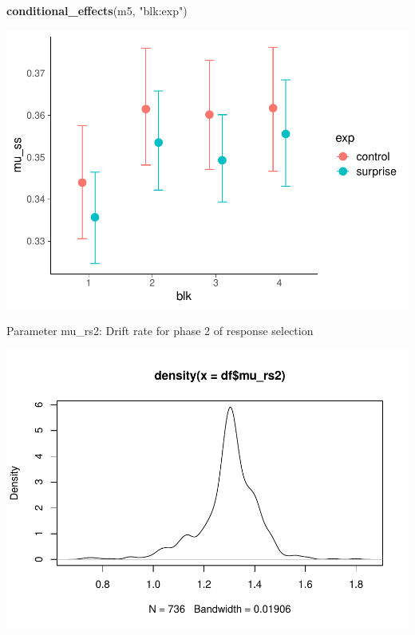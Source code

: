 \documentclass[
]{article}
\newenvironment{Shaded}{\begin{snugshade}}{\end{snugshade}}
\newcommand{\FunctionTok}[1]{\textcolor[rgb]{0.13,0.29,0.53}{\textbf{#1}}}
\newcommand{\NormalTok}[1]{#1}
\newcommand{\SpecialCharTok}[1]{\textcolor[rgb]{0.81,0.36,0.00}{\textbf{#1}}}
\newcommand{\StringTok}[1]{\textcolor[rgb]{0.31,0.60,0.02}{#1}}
\begin{document}
\begin{Shaded}
\begin{Highlighting}[]
\FunctionTok{conditional\_effects}\NormalTok{(m5, }\StringTok{"blk:exp"}\NormalTok{)}
\end{Highlighting}
\end{Shaded}

\includegraphics{params_analyses_files/figure-latex/unnamed-chunk-6-3.pdf}

Parameter mu\_rs2: Drift rate for phase 2 of response selection

\begin{Shaded}
\end{Shaded}

\includegraphics{params_analyses_files/figure-latex/unnamed-chunk-7-1.pdf}
\end{document}
